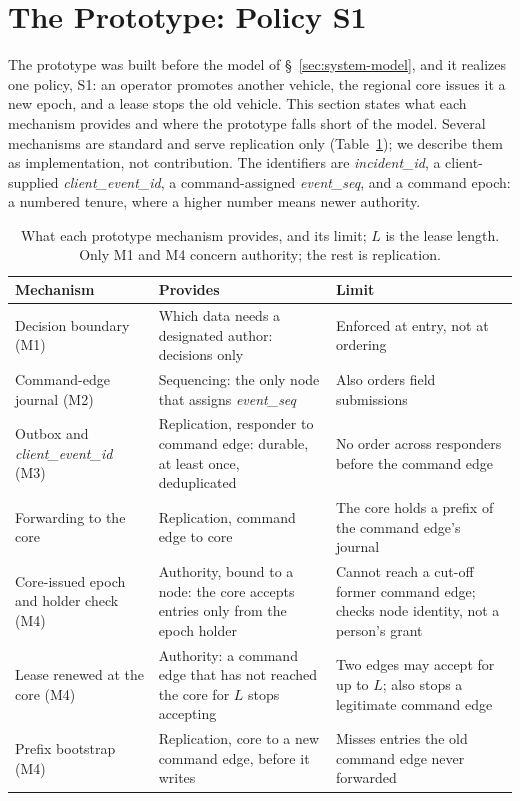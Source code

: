 \section{The \systemname{} Prototype: Policy S1}
\label{sec:architecture}

The \systemname{} prototype was built before the model of \S~\ref{sec:system-model}, and it
realizes one policy, S1: an operator promotes another vehicle, the regional core issues
it a new epoch, and a lease stops the old vehicle. This section states what each
mechanism provides and where the prototype falls short of the model. Several mechanisms
are standard and serve replication only (Table~\ref{tab:mechanisms}); we describe them as
implementation, not contribution. The identifiers are \textit{incident\_id}, a
client-supplied \textit{client\_event\_id}, a command-assigned \textit{event\_seq}, and a
command epoch: a numbered tenure, where a higher number means newer authority.

\begin{table}[t]
\centering
\caption{What each prototype mechanism provides, and its limit; $L$ is the lease length.
Only M1 and M4 concern authority; the rest is replication.}
\label{tab:mechanisms}
\scriptsize
\setlength{\tabcolsep}{2.5pt}
\begin{tabularx}{\columnwidth}{@{}>{\raggedright\arraybackslash}p{}>{\raggedright\arraybackslash}p{}>{\raggedright\arraybackslash}X@{}}
\toprule
\textbf{Mechanism} & \textbf{Provides} & \textbf{Limit} \\
\midrule
Decision boundary (M1) & Which data needs a designated author: decisions only & Enforced at entry, not at ordering \\
\addlinespace
Command-edge journal (M2) & Sequencing: the only node that assigns \textit{event\_seq} & Also orders field submissions \\
\addlinespace
Outbox and \textit{client\_event\_id} (M3) & Replication, responder to command edge: durable, at least once, deduplicated & No order across responders before the command edge \\
\addlinespace
Forwarding to the core & Replication, command edge to core & The core holds a prefix of the command edge's journal \\
\addlinespace
Core-issued epoch and holder check (M4) & Authority, bound to a node: the core accepts entries only from the epoch holder & Cannot reach a cut-off former command edge; checks node identity, not a person's grant \\
\addlinespace
Lease renewed at the core (M4) & Authority: a command edge that has not reached the core for $L$ stops accepting & Two edges may accept for up to $L$; also stops a legitimate command edge \\
\addlinespace
Prefix bootstrap (M4) & Replication, core to a new command edge, before it writes & Misses entries the old command edge never forwarded \\
\bottomrule
\end{tabularx}
\end{table}

